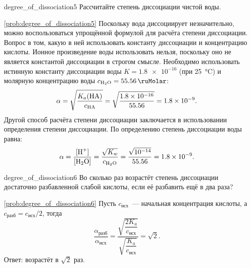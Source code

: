 \begin{problem}{}{degree_of_dissociation5}
    Рассчитайте степень диссоциации чистой воды.
    \begin{sol}{\ref{prob:degree_of_dissociation5}}
        Поскольку вода диссоциирует незначительно, можно воспользоваться упрощённой формулой для расчёта степени диссоциации. Вопрос в том, какую в ней использовать константу диссоциации и концентрацию кислоты. Ионное произведение воды использовать нельзя, поскольку оно не является константой диссоциации в строгом смысле. Необходимо использовать истинную константу диссоциации воды $K = \num{1,8e-16}$ (при \qty{25}{\degreeCelsius}) и молярную концентрацию воды $c_{\ce{H2O}} = \qty{55,56}{\ruMolar}$:
        \begin{equation*}
            \alpha = \sqrt{\frac{K_a(\ce{HA})}{c_{\ce{HA}}}}
            = \sqrt{\frac{\num{1,8e-16}}{\num{55,56}}}
            = \num{1,8e-9}.
        \end{equation*}
        Другой способ расчёта степени диссоциации заключается в использовании определения степени диссоциации. По определению степень диссоциации воды равна:
        \begin{equation*}
            \alpha = \frac{[\ce{H^+}]}{[\ce{H2O}]}
            = \frac{\sqrt{K_w}}{c_{\ce{H2O}}}
            = \frac{\sqrt{\num{e-14}}}{\num{55,56}}
            = \num{1,8e-9}.
        \end{equation*}
    \end{sol}
\end{problem}

\begin{problem}{}{degree_of_dissociation6}
    Во сколько раз возрастёт степень диссоциации достаточно разбавленной слабой кислоты, если её разбавить ещё в два раза?
    \begin{sol}{\ref{prob:degree_of_dissociation6}}
        Пусть $c_{\text{исх}}$~--- начальная концентрация кислоты, а $c_{\text{разб}} = c_{\text{исх}}/2$, тогда
        \begin{equation*}
            \frac{{\alpha}_{\text{разб}}}{{\alpha}_{\text{исх}}}
            = \frac{\sqrt{\dfrac{2K_a}{c_{\text{исх}}}}}{\sqrt{\dfrac{K_a}{c_{\text{исх}}}}}
            = \sqrt{2}.
        \end{equation*}
        Ответ: возрастёт в $\sqrt{2}$ раз.
    \end{sol}
\end{problem}


